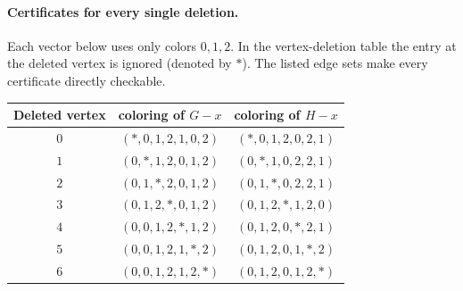 \documentclass[10pt]{article}
\begin{document}
\paragraph{Certificates for every single deletion.}
Each vector below uses only colors $0,1,2$. In the vertex-deletion
table the entry at the deleted vertex is ignored (denoted by $*$).
The listed edge sets make every certificate directly checkable.
\begin{center}
\begin{tabular}{c|c|c}
Deleted vertex & coloring of $G-x$ & coloring of $H-x$\\ \hline
$0$ & $(*,0,1,2,1,0,2)$ & $(*,0,1,2,0,2,1)$ \\
$1$ & $(0,*,1,2,0,1,2)$ & $(0,*,1,0,2,2,1)$ \\
$2$ & $(0,1,*,2,0,1,2)$ & $(0,1,*,0,2,2,1)$ \\
$3$ & $(0,1,2,*,0,1,2)$ & $(0,1,2,*,1,2,0)$ \\
$4$ & $(0,0,1,2,*,1,2)$ & $(0,1,2,0,*,2,1)$ \\
$5$ & $(0,0,1,2,1,*,2)$ & $(0,1,2,0,1,*,2)$ \\
$6$ & $(0,0,1,2,1,2,*)$ & $(0,1,2,0,1,2,*)$ \\
\end{tabular}
\end{center}
\end{document}
